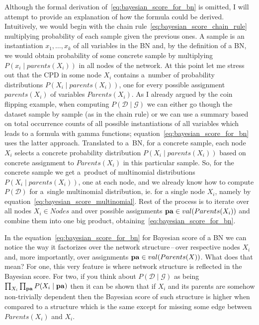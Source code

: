 \documentclass[english,cover]{fitthesis} %
\newcommand{\vars}[1]{{\bold{#1}}}         %
\begin{document}
Although the formal derivation of~\eqref{eq:bayesian_score_for_bn} is omitted, I will attempt to provide an explanation of how the formula could be derived. Intuitively, we would begin with the chain rule~\eqref{eq:bayesian_score_chain_rule} multiplying probability of each sample given the previous ones. A sample is an instantiation $x_1, \dots, x_k$ of all variables in the BN and, by the definition of a BN, we would obtain probability of some concrete sample by multiplying $P(x_i \mid parents(X_i))$ in all nodes of the network. At this point let me stress out that the CPD in some node $X_i$ contains a~number of probability distributions $P(X_i \mid parents(X_i))$, one for every possible assignment $parents(X_i)$ of variables $Parents(X_i)$. As I already argued by the coin flipping example, when computing $P(\mathcal{D} \mid \mathcal{G})$ we can either go though the dataset sample by sample (as in the chain rule) or we can use a summary based on total occurrence counts of all possible instantiations of all variables which leads to a formula with gamma functions; equation~\eqref{eq:bayesian_score_for_bn} uses the latter approach. Translated to a~BN, for a concrete sample, each node $X_i$ selects a concrete probability distribution $P(X_i \mid parents(X_i))$ based on concrete assignment to $Parents(X_i)$ in this particular sample. So, for the concrete sample we get a~product of multinomial distributions $P(X_i \mid parents(X_i))$, one at each node, and we already know how to compute $P(\mathcal{D})$ for a~single multinomial distribution, ie. for a single node $X_i$, namely by equation~\eqref{eq:bayesian_score_multinomial}. Rest of the process is to iterate over all nodes $X_i \in Nodes$ and over possible assignments $\vars{pa} \in val(Parents(X_i))$ and combine them into one big product, obtaining~\eqref{eq:bayesian_score_for_bn}.

In the equation~\eqref{eq:bayesian_score_for_bn} for Bayesian score of a BN we can notice the way it factorizes over the network structure\,--\,over respective nodes $X_i$ and, more importantly, over assignments $\vars{pa} \in val(Parents(X))$. What does that mean? For one, this very feature is where network structure is reflected in the Bayesian score. For two, if you think about $P(\mathcal{D} \mid \mathcal{G})$ as being $\prod_{X_i} \prod_{\vars{pa}} P(X_i \mid \vars{pa})$ then it can be shown that if $X_i$ and its parents are somehow non-trivially dependent then the Bayesian score of such structure is higher when compared to a structure which is the same except for missing some edge between $Parents(X_i)$ and $X_i$.
\end{document}

